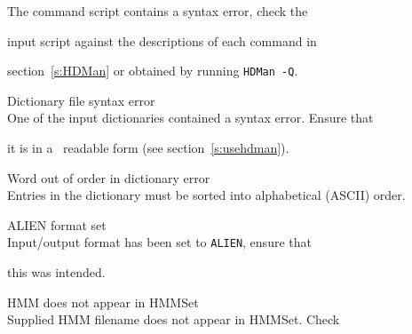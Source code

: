 \begin{itemize}
\begin{itemize}
        The  command script contains a syntax error, check the 


        input script against the descriptions of each command in 


        section~\ref{s:HDMan} or obtained by running \texttt{HDMan -Q}.





 Dictionary file syntax error\\


        One of the input dictionaries contained a syntax error.  Ensure that 


        it is in a \HTK\ readable form (see section~\ref{s:usehdman}).





 Word out of order in dictionary error\\


        Entries in the dictionary must be sorted into alphabetical (ASCII) order.





\end{itemize}










\begin{itemize}


    ALIEN format set\\


        Input/output format has been set to \texttt{ALIEN}, ensure that 


        this was intended.





\end{itemize}










\begin{itemize}


    HMM does not appear in HMMSet\\


        Supplied HMM filename does not appear in HMMSet. Check



\end{itemize}
\end{itemize}
